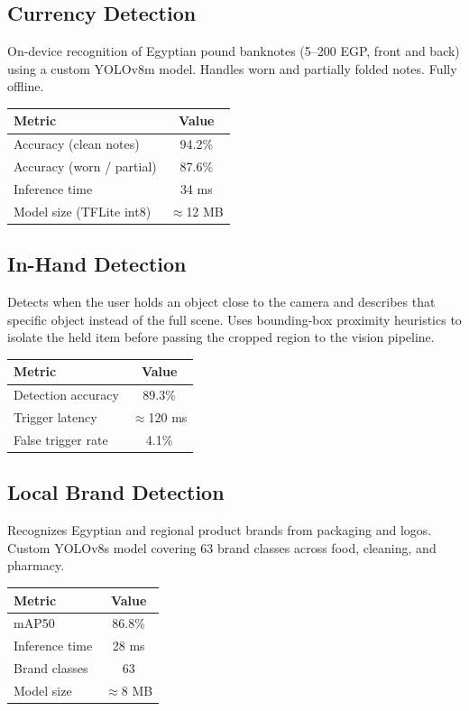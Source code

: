 \documentclass[12pt, a4paper]{article}
\begin{document}
\subsection{Currency Detection}
On-device recognition of Egyptian pound banknotes (5--200 EGP, front and back) using
a custom YOLOv8m model. Handles worn and partially folded notes. Fully offline.

\begin{center}
\begin{tabular}{lc}
\toprule
\textbf{Metric} & \textbf{Value} \\
\midrule
Accuracy (clean notes)     & 94.2\% \\
Accuracy (worn / partial)  & 87.6\% \\
Inference time             & 34 ms  \\
Model size (TFLite int8)   & $\approx$12 MB \\
\bottomrule
\end{tabular}
\end{center}

\subsection{In-Hand Detection}
Detects when the user holds an object close to the camera and describes that specific
object instead of the full scene. Uses bounding-box proximity heuristics to isolate
the held item before passing the cropped region to the vision pipeline.

\begin{center}
\begin{tabular}{lc}
\toprule
\textbf{Metric} & \textbf{Value} \\
\midrule
Detection accuracy   & 89.3\% \\
Trigger latency      & $\approx$120 ms \\
False trigger rate   & 4.1\% \\
\bottomrule
\end{tabular}
\end{center}

\subsection{Local Brand Detection}
Recognizes Egyptian and regional product brands from packaging and logos.
Custom YOLOv8s model covering 63 brand classes across food, cleaning, and pharmacy.

\begin{center}
\begin{tabular}{lc}
\toprule
\textbf{Metric} & \textbf{Value} \\
\midrule
mAP50              & 86.8\% \\
Inference time     & 28 ms  \\
Brand classes      & 63     \\
Model size         & $\approx$8 MB \\
\bottomrule
\end{tabular}
\end{center}
\end{document}

